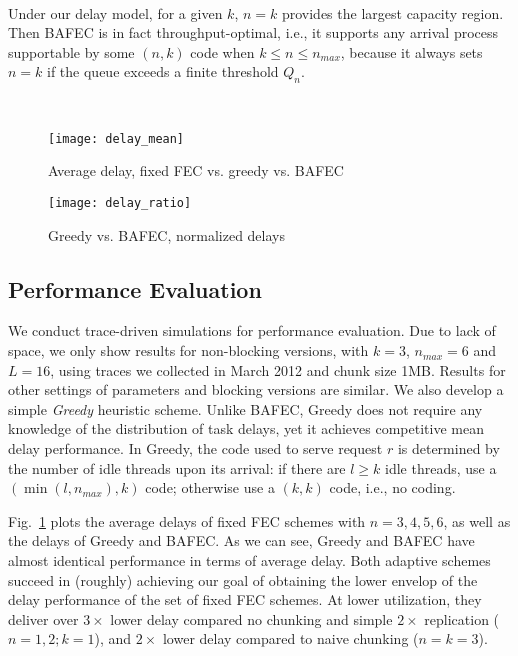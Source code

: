 \documentclass[journal]{IEEEtran}
\newcommand{\nonBlocking}{{BAFEC}\xspace}
\begin{document}
~

Under our delay model, for a given $k$, $n=k$ provides the largest capacity region. Then \nonBlocking is in fact throughput-optimal, i.e., it supports any arrival process supportable by some $(n,k)$ code when $k\le n\le n_{max}$, because it always sets $n=k$ if the queue exceeds a finite threshold $Q_n$.   

~

\begin{figure}[t]
\centering
\texttt{[image: delay\_mean]}
\vspace{-10pt}
\caption{Average delay, fixed FEC vs. greedy vs. \nonBlocking}
\label{fig:delay:mean}
\end{figure}


\begin{figure}[t]
\centering
\texttt{[image: delay\_ratio]}
\vspace{-10pt}
\caption{Greedy vs. \nonBlocking, normalized delays}
\label{fig:delay:ratio}
\vspace{-10pt}
\end{figure}

\subsection{Performance Evaluation}
We conduct trace-driven simulations for performance evaluation. Due to lack of space, we only show results for non-blocking versions, with $k=3$, $n_{max} = 6$ and $L=16$, using traces we collected in March 2012 and chunk size 1MB. Results for other settings of parameters and blocking versions are similar.
We also develop a simple {\em Greedy} heuristic scheme. Unlike \nonBlocking, Greedy does not require any knowledge of the distribution of task delays, yet it achieves competitive mean delay performance. In Greedy, the code used to serve request $r$ is determined by the number of idle threads upon its arrival: if there are $l \ge k$ idle threads, use a $(\min(l,n_{max}),k)$ code; otherwise use a $(k,k)$ code, i.e., no coding.

Fig.~\ref{fig:delay:mean} plots the average delays of fixed FEC schemes with $n=3,4,5,6$, as well as the delays of  Greedy  and \nonBlocking. As we can see, Greedy and \nonBlocking have almost identical performance in terms of average delay. Both adaptive schemes succeed in (roughly) achieving our goal of obtaining the lower envelop of the delay performance of the set of fixed FEC schemes. At lower utilization, they deliver over $3\times$ lower delay compared no chunking and simple $2\times$ replication ($n=1,2;k=1$), and $2\times$ lower delay compared to naive chunking ($n=k=3$).
\end{document}

